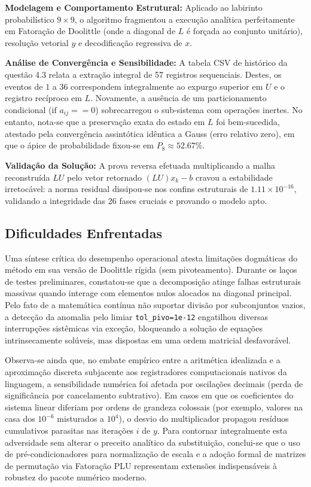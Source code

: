 \textbf{Modelagem e Comportamento Estrutural:} Aplicado ao labirinto probabilístico $9 \times 9$, o algoritmo fragmentou a execução analítica perfeitamente em Fatoração de Doolittle (onde a diagonal de $L$ é forçada ao conjunto unitário), resolução vetorial $y$ e decodificação regressiva de $x$.

\textbf{Análise de Convergência e Sensibilidade:} A tabela CSV de histórico da questão 4.3 relata a extração integral de 57 registros sequenciais. Destes, os eventos de $1$ a $36$ correspondem integralmente ao expurgo superior em $U$ e o registro recíproco em $L$. Novamente, a ausência de um particionamento condicional (if $a_{ij} == 0$) sobrecarregou o sub-sistema com operações inertes. No entanto, nota-se que a preservação exata do estado em $L$ foi bem-sucedida, atestado pela convergência assintótica idêntica a Gauss (erro relativo zero), em que o ápice de probabilidade fixou-se em $P_8 \approx 52.67\%$. 

\textbf{Validação da Solução:} A prova reversa efetuada multiplicando a malha reconstruída $LU$ pelo vetor retornado $(LU)x_k - b$ cravou a estabilidade irretocável: a norma residual dissipou-se nos confins estruturais de $1.11 \times 10^{-16}$, validando a integridade das 26 fases cruciais e provando o modelo apto.

\vspace{1cm}

\subsection{Dificuldades Enfrentadas}

Uma síntese crítica do desempenho operacional atesta limitações dogmáticas do método em sua versão de Doolittle rígida (sem pivoteamento). Durante os laços de testes preliminares, constatou-se que a decomposição atinge falhas estruturais massivas quando interage com elementos nulos alocados na diagonal principal. Pelo fato de a matemática contínua não suportar divisão por subconjuntos vazios, a detecção da anomalia pelo limiar \texttt{tol\_pivo=1e-12} engatilhou diversas interrupções sistêmicas via exceção, bloqueando a solução de equações intrinsecamente solúveis, mas dispostas em uma ordem matricial desfavorável.

Observa-se ainda que, no embate empírico entre a aritmética idealizada e a aproximação discreta subjacente aos registradores computacionais nativos da linguagem, a sensibilidade numérica foi afetada por oscilações decimais (perda de significância por cancelamento subtrativo). Em casos em que os coeficientes do sistema linear diferiam por ordens de grandeza colossais (por exemplo, valores na casa dos $10^{-6}$ misturados a $10^{4}$), o desvio do multiplicador propagou resíduos cumulativos parasitas nas iterações $i$ de $y$. Para contornar integralmente esta adversidade sem alterar o preceito analítico da substituição, conclui-se que o uso de pré-condicionadores para normalização de escala e a adoção formal de matrizes de permutação via Fatoração PLU representam extensões indispensáveis à robustez do pacote numérico moderno.